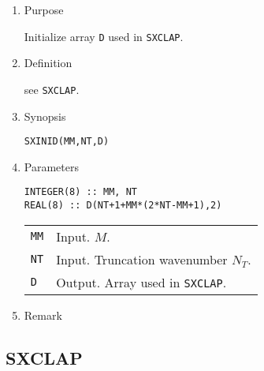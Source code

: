 \documentclass[a4paper]{scrartcl}
\begin{document}
\begin{enumerate}

\item Purpose 

Initialize array \texttt{D} used in \texttt{SXCLAP}. 

\item Definition

see \texttt{SXCLAP}.

\item Synopsis 

\texttt{SXINID(MM,NT,D)}
  
\item Parameters

\begin{verbatim}
INTEGER(8) :: MM, NT
REAL(8) :: D(NT+1+MM*(2*NT-MM+1),2)
\end{verbatim}

\begin{tabular}{ll}
\texttt{MM} & Input. $M$.\\  
\texttt{NT} & Input. Truncation wavenumber $N_T$.\\
\texttt{D} & Output. Array used in \texttt{SXCLAP}.
\end{tabular}

\item Remark
    
\end{enumerate}


\subsection{SXCLAP}
\end{document}
